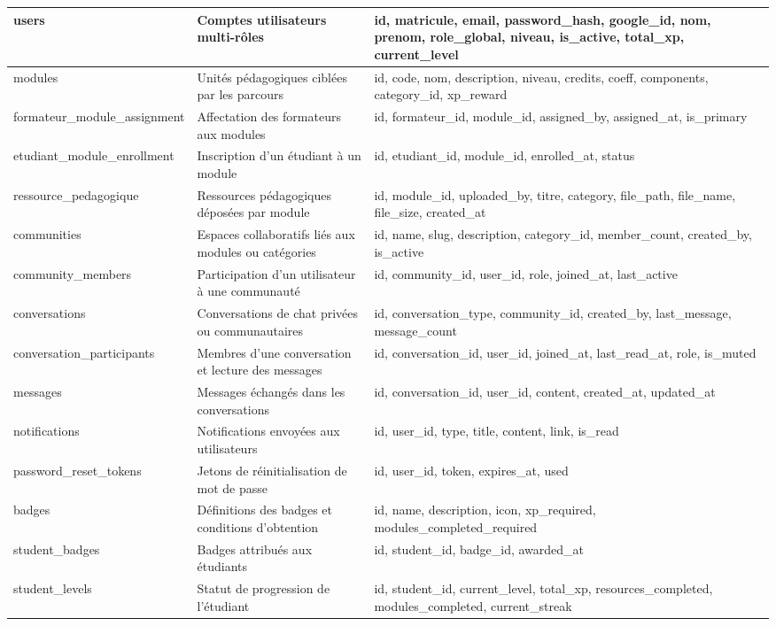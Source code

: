 \documentclass[12pt,a4paper,oneside]{report}
\begin{document}
\begin{longtable}{|p{3.4cm}|p{4.4cm}|p{4.4cm}|}
users & Comptes utilisateurs multi-rôles & id, matricule, email, password\_hash, google\_id, nom, prenom, role\_global, niveau, is\_active, total\_xp, current\_level \\
\hline
modules & Unités pédagogiques ciblées par les parcours & id, code, nom, description, niveau, credits, coeff, components, category\_id, xp\_reward \\
\hline
formateur\_module\_assignment & Affectation des formateurs aux modules & id, formateur\_id, module\_id, assigned\_by, assigned\_at, is\_primary \\
\hline
etudiant\_module\_enrollment & Inscription d'un étudiant à un module & id, etudiant\_id, module\_id, enrolled\_at, status \\
\hline
ressource\_pedagogique & Ressources pédagogiques déposées par module & id, module\_id, uploaded\_by, titre, category, file\_path, file\_name, file\_size, created\_at \\
\hline
communities & Espaces collaboratifs liés aux modules ou catégories & id, name, slug, description, category\_id, member\_count, created\_by, is\_active \\
\hline
community\_members & Participation d'un utilisateur à une communauté & id, community\_id, user\_id, role, joined\_at, last\_active \\
\hline
conversations & Conversations de chat privées ou communautaires & id, conversation\_type, community\_id, created\_by, last\_message, message\_count \\
\hline
conversation\_participants & Membres d'une conversation et lecture des messages & id, conversation\_id, user\_id, joined\_at, last\_read\_at, role, is\_muted \\
\hline
messages & Messages échangés dans les conversations & id, conversation\_id, user\_id, content, created\_at, updated\_at \\
\hline
notifications & Notifications envoyées aux utilisateurs & id, user\_id, type, title, content, link, is\_read \\
\hline
password\_reset\_tokens & Jetons de réinitialisation de mot de passe & id, user\_id, token, expires\_at, used \\
\hline
badges & Définitions des badges et conditions d'obtention & id, name, description, icon, xp\_required, modules\_completed\_required \\
\hline
student\_badges & Badges attribués aux étudiants & id, student\_id, badge\_id, awarded\_at \\
\hline
student\_levels & Statut de progression de l'étudiant & id, student\_id, current\_level, total\_xp, resources\_completed, modules\_completed, current\_streak \\

\end{longtable}
\end{document}
